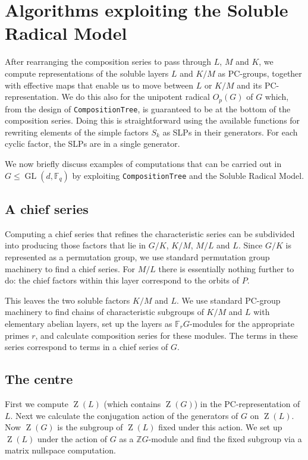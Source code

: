 \documentclass[12pt,twoside,reqno,psamsfonts]{amsproc}
\numberwithin{equation}{section}
\numberwithin{figure}{section}
\theoremstyle{plain}
\theoremstyle{definition}
\theoremstyle{remark}
\newcommand{\field}[1]{\mathbb{#1}}
\newcommand{\Z}{\field{Z}}
\newcommand{\F}{\field{F}}
\DeclareMathOperator{\GL}{GL}
\DeclareMathOperator{\Zent}{Z}
\begin{document}
\section{Algorithms exploiting the Soluble Radical Model}\label{section:furthercomp}
After rearranging the composition series to pass through $L$, $M$ and $K$,
we compute representations of the soluble layers $L$ and $K/M$ as PC-groups,
together with effective maps that enable us to move  between
$L$ or $K/M$ and its PC-representation.
We do this also for the unipotent radical ${O}_p(G)$ of $G$ which,
from the design of {\tt CompositionTree}, is guaranteed to be at the bottom of
the composition series. Doing this is straightforward
using the available functions for rewriting elements of the simple factors
$S_k$ as SLPs in their generators. For each cyclic factor,
the SLPs are in a single generator.

We now briefly discuss examples of computations that can 
be carried out in $G \leqslant \GL(d,\F_q)$ by exploiting 
{\tt CompositionTree} and the Soluble Radical Model. 

\subsection{A chief series}
Computing a chief series that refines the characteristic
series can be subdivided into producing those factors that
lie in $G/K$, $K/M$, $M/L$ and $L$. 
Since $G/K$ is represented as a permutation group, 
we use standard permutation group machinery
to find a chief series.
For $M/L$ there is essentially nothing further to do: 
the chief factors within this layer correspond to the orbits of $P$.

This leaves the two soluble factors $K/M$ and $L$.
We use standard PC-group machinery to
find chains of characteristic subgroups of $K/M$ and $L$ with elementary
abelian layers, set up the layers as $\F_rG$-modules for the
appropriate primes $r$, and calculate composition series for these modules.
The terms in these series correspond to terms in a chief series of $G$.

\subsection{The centre}
First we compute
$\Zent(L)$ (which contains $\Zent(G)$) in the PC-representation of $L$. Next
we calculate the conjugation action of the generators of $G$ on $\Zent(L)$.
Now $\Zent(G)$ is the subgroup of $\Zent(L)$ fixed under this action.
We set up $\Zent(L)$ under the action of $G$ as a $\Z G$-module
and find the fixed subgroup via a matrix nullspace computation. 
\end{document}
